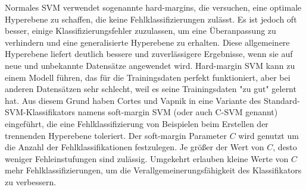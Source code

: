 Normales SVM verwendet sogenannte hard-margins, die versuchen, eine optimale Hyperebene zu schaffen, die keine Fehlklassifizierungen zulässt. 
Es ist jedoch oft besser, einige Klassifizierungsfehler zuzulassen, um eine Überanpassung zu verhindern und eine generalisierte Hyperebene zu erhalten. Diese allgemeinere Hyperebene liefert deutlich bessere und zuverlässigere Ergebnisse, wenn sie auf neue und unbekannte Datensätze angewendet wird.
Hard-margin SVM kann zu einem Modell führen, das für die Trainingsdaten perfekt funktioniert, aber bei anderen Datensätzen sehr schlecht, weil es seine Trainingsdaten "zu gut" gelernt hat.
Aus diesem Grund haben Cortes und Vapnik in \cite{svn1995} eine Variante des Standard-SVM-Klassifikators namens soft-margin SVM (oder auch C-SVM genannt) eingeführt, die eine Fehlklassifizierung von Beispielen beim Erstellen der trennenden Hyperebene toleriert.
Der soft-margin Parameter $C$ wird genutzt um die Anzahl der Fehlklassifikationen festzulegen.
Je größer der Wert von $C$, desto weniger Fehleinstufungen sind zulässig.
Umgekehrt erlauben kleine Werte von $C$ mehr Fehlklassifizierungen, um die Verallgemeinerungsfähigkeit des Klassifikators zu verbessern. \\


\begin{figure}[h] 
\label{fig:c-svm} \end{figure} 
\vspace{0.5cm}